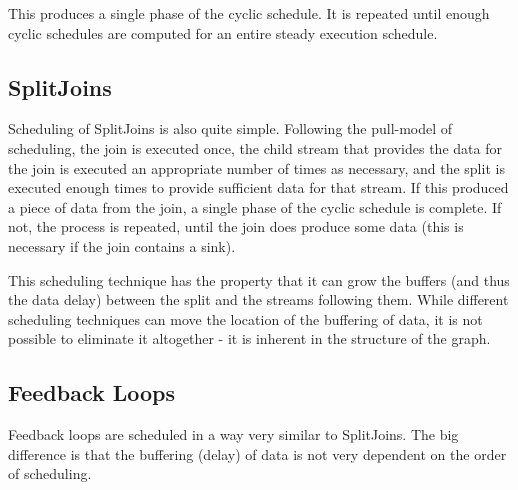 This produces a single phase of the cyclic schedule.  It is repeated until
enough cyclic schedules are computed for an entire steady execution
schedule.

\subsection{SplitJoins}

Scheduling of SplitJoins is also quite simple.  Following the pull-model
of scheduling, the join is executed once, the child stream that provides
the data for the join is executed an appropriate number of times as
necessary, and the split is executed enough times to provide sufficient data
for that stream.  If this produced a piece of data from the join, a single
phase of the cyclic schedule is complete.  If not, the process is
repeated, until the join does produce some data (this is necessary if the
join contains a sink).

This scheduling technique has the property that it can grow the buffers
(and thus the data delay) between the split and the streams following
them.  While different scheduling techniques can move the location of the
buffering of data, it is not possible to eliminate it altogether - it is
inherent in the structure of the graph.

\subsection{Feedback Loops}

Feedback loops are scheduled in a way very similar to SplitJoins.  The big
difference is that the buffering (delay) of data is not very dependent on
the order of scheduling.

